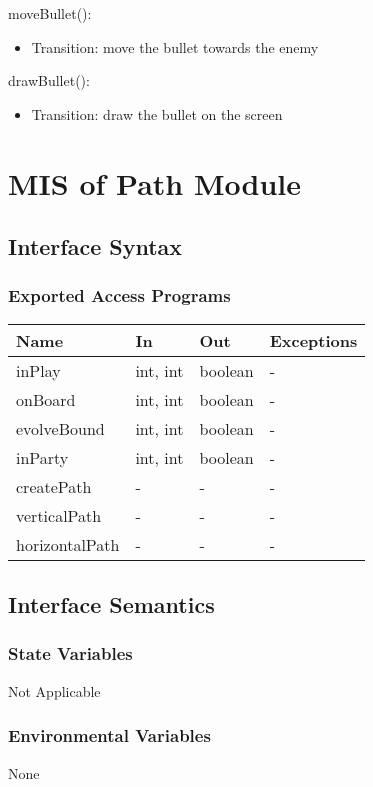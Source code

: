 \documentclass[12,english]{article}
\begin{document}
\noindent moveBullet():
\begin{itemize}
    \item Transition: move the bullet towards the enemy
\end{itemize}

\noindent drawBullet():
\begin{itemize}
    \item Transition: draw the bullet on the screen
\end{itemize}

\section{MIS of Path Module}
\subsection{Interface Syntax}
\subsubsection{Exported Access Programs}
\begin{table}[h!]
    \centering
    \begin{tabular}{|p{4cm}|p{2cm}|p{2cm}|p{2cm}|}
    \hline
    \textbf {Name}  & {In} & {Out} & {Exceptions} \\
    \hline
    inPlay & int, int & boolean & -\\
    \hline
    onBoard & int, int & boolean & -\\
    \hline
    evolveBound & int, int & boolean & -\\
    \hline
    inParty & int, int & boolean & -\\
    \hline
    createPath & - & - & -\\
    \hline
    verticalPath & - & - & -\\
    \hline
    horizontalPath & - & - & -\\
    \hline
    \end{tabular}
\end{table}
\subsection{Interface Semantics}
\subsubsection{State Variables}
Not Applicable 
\subsubsection{Environmental Variables}
None
\end{document}
